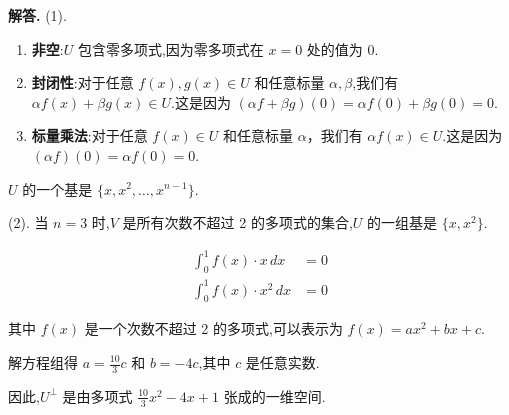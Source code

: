 \documentclass[12pt, a4paper, oneside]{ctexart}
\newcounter{problemname}
\newenvironment{solution}{\par\noindent\textbf{解答. }}{\par}
\newenvironment{note}{\par\noindent\textbf{题目\arabic{problemname}的注记. }}{\par}
\begin{document}
\begin{solution}
    (1).   
    \begin{enumerate}
        \item \textbf{非空}:\( U \) 包含零多项式,因为零多项式在 \( x = 0 \) 处的值为 0.
        \item \textbf{封闭性}:对于任意 \( f(x), g(x) \in U \) 和任意标量 \( \alpha, \beta \),我们有 \( \alpha f(x) + \beta g(x) \in U \).这是因为 \( (\alpha f + \beta g)(0) = \alpha f(0) + \beta g(0) = 0 \).
        \item \textbf{标量乘法}:对于任意 \( f(x) \in U \) 和任意标量 \( \alpha \)，我们有 \( \alpha f(x) \in U \).这是因为 \( (\alpha f)(0) = \alpha f(0) = 0 \).
    \end{enumerate}

    \( U \) 的一个基是 \( \{x, x^2, \ldots, x^{n-1}\} \).

    (2).
    当 \( n = 3 \) 时,\( V \) 是所有次数不超过 2 的多项式的集合,\( U \) 的一组基是 \( \{x, x^2\} \).

    $$
    \begin{aligned}
    \int_{0}^{1} f(x) \cdot x \, dx &= 0 \\
    \int_{0}^{1} f(x) \cdot x^2 \, dx &= 0
    \end{aligned}
    $$

    其中 \( f(x) \) 是一个次数不超过 2 的多项式,可以表示为 \( f(x) = ax^2 + bx + c \).

    解方程组得 \( a = \frac{10}{3}c \) 和 \( b = -4c \),其中 \( c \) 是任意实数.

    因此,\( U^\perp \) 是由多项式 \( \frac{10}{3}x^2 - 4x + 1 \) 张成的一维空间.

\end{solution}
\end{document}
